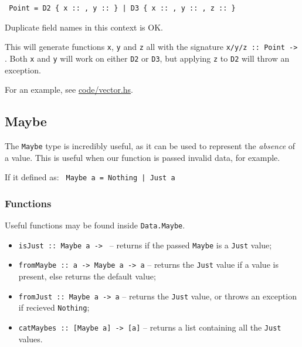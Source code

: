 \texttt{ Point = D2 \{ x :: , y ::  \} | D3 \{ x :: , y :: , z ::  \}}

Duplicate field names in this context is OK.

This will generate functions \texttt{x}, \texttt{y} and \texttt{z} all with the signature \texttt{x/y/z :: Point -> }. Both \texttt{x} and \texttt{y} will work on either \texttt{D2} or \texttt{D3}, but applying \texttt{z} to \texttt{D2} will throw an exception.

For an example, see \url{code/vector.hs}.

\subsection{Maybe}
The \texttt{Maybe} type is incredibly useful, as it can be used to represent the \textit{absence} of a value. This is useful when our function is passed invalid data, for example.

If it defined as: \texttt{ Maybe a = Nothing | Just a}

\subsubsection{Functions}
Useful functions may be found inside \texttt{Data.Maybe}.
\begin{itemize}
  \item \texttt{isJust :: Maybe a -> } -- returns if the passed \texttt{Maybe} is a \texttt{Just} value;
  \item \texttt{fromMaybe :: a -> Maybe a -> a} -- returns the \texttt{Just} value if a value is present, else returns the default value;
  \item \texttt{fromJust :: Maybe a -> a} -- returns the \texttt{Just} value, or throws an exception if recieved \texttt{Nothing};
  \item \texttt{catMaybes :: [Maybe a] -> [a]} -- returns a list containing all the \texttt{Just} values.
\end{itemize}
